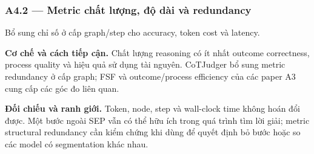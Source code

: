 \subsubsection*{A4.2 — Metric chất lượng, độ dài và redundancy}
Bổ sung chỉ số ở cấp graph/step cho accuracy, token cost và latency.

\noindent\textbf{Cơ chế và cách tiếp cận.} Chất lượng reasoning có ít nhất outcome correctness, process quality và hiệu quả sử dụng tài nguyên. CoTJudger bổ sung metric redundancy ở cấp graph; FSF và outcome/process efficiency của các paper A3 cung cấp các góc đo liên quan.\par
\noindent\textbf{Đối chiếu và ranh giới.} Token, node, step và wall-clock time không hoán đổi được. Một bước ngoài SEP vẫn có thể hữu ích trong quá trình tìm lời giải; metric structural redundancy cần kiểm chứng khi dùng để quyết định bỏ bước hoặc so các model có segmentation khác nhau.\par

